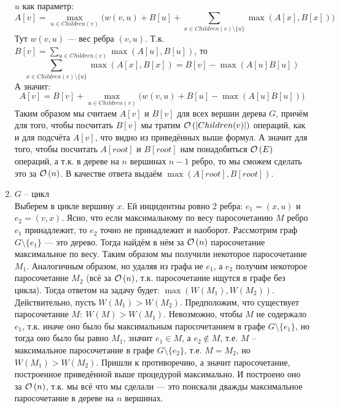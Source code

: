 \begin{enumerate}[label=(\alph*)]
$u$ как параметр:
\[
	A[v] = \max_{u \in Children(v)}{\big( w(v, u) + B[u] + \sum_{x \in Children(v)\setminus \lbrace u \rbrace}{\max(A[x], B[x])}   \big)}
\]
Тут $w(v,u)$ --- вес ребра $(v,u)$. Т.к. $B[v] =  \sum_{u\in Children(v)}{\max(A[u],B[u])}$, то 
\[ 
	\sum_{x \in Children(v)\setminus \lbrace u \rbrace}{\max(A[x], B[x])} = B[v] - \max(A[u]B[u])
\]
А значит:
\[
	A[v] = B[v] + \max_{u \in Children(v)}{\big( w(v, u) + B[u] - \max(A[u]B[u])   \big)}
\]
Таким образом мы считаем $A[v]$ и $B[v]$ для всех вершин дерева $G$, причём для того, чтобы посчитать $B[v]$ мы тратим
$\mathcal{O}\left(|Children(v)|\right)$ операций, как и для подсчёта $A[v]$, что видно из приведённых выше формул. А значит для того, чтобы
посчитать $A[root]$ и $B[root]$ нам понадобиться $\mathcal{O}\left(E\right)$ операций, а т.к. в дереве на $n$ вершинах $n-1$ ребро, то
мы сможем сделать это за $\mathcal{O}\left(n\right)$. В качестве ответа выдаём $\max{(A[root], B[root])}$. \xqed

\item $G$ -- цикл\\
Выберем в цикле вершину $x$. Ей инцидентны ровно 2 ребра: $e_1=(x,u)$ и $e_2=(v,x)$. Ясно, что если максимальному по весу паросочетанию
$M$ ребро $e_1$ принадлежит, то $e_2$ точно не принадлежит и наоборот. Рассмотрим граф $G\setminus \lbrace e_1 \rbrace$
--- это дерево. Тогда найдём в нём за $\mathcal{O}\left(n\right)$ паросочетание максимальное по весу. Таким
образом мы получили некоторое паросочетание $M_1$. Аналогичным образом, но удаляя из графа не $e_1$, а $e_2$ получим некоторое
паросочетание $M_2$ (всё за $\mathcal{O}\left(n\right)$, т.к. паросочетание ищутся в графе без цикла). Тогда ответом на задачу будет:
$\max{(W(M_1), W(M_2))}$. Действительно, пусть $W(M_1)>W(M_2)$. Предположим, что существует паросочетание $M:\ W(M)>W(M_1)$.
Невозможно, чтобы $M$ не содержало $e_1$, т.к. иначе оно было бы максимальным паросочетанием в графе $G\setminus \lbrace e_1 \rbrace$,
но тогда оно было бы равно $M_1$, значит $e_1 \in M$, а $e_2 \notin M$, т.е. $M$ -- максимальное паросочетание в графе 
$G\setminus \lbrace e_2 \rbrace$, т.е. $M=M_2$, но $W(M_1) > W(M_2)$. Пришли к противоречию, а значит паросочетание, построенное 
приведённой выше процедурой максимально. И построено оно за $\mathcal{O}\left(n\right)$, т.к. мы всё что мы сделали --- это поискали дважды
максимальное паросочетание в дереве на $n$ вершинах. \xqed


\end{enumerate}
